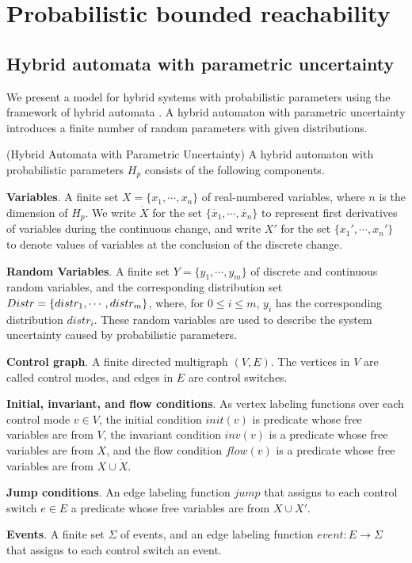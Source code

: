 \section{Probabilistic bounded reachability}

\subsection{Hybrid automata with parametric uncertainty}
We present a model for hybrid systems with probabilistic parameters using the framework of hybrid automata \cite{henzinger2000theory}. A hybrid automaton with parametric uncertainty introduces a finite number of random 
parameters with given distributions.
\begin{definition}
\label{def:ha}
{\rm(Hybrid Automata with Parametric Uncertainty)} A hybrid automaton with probabilistic parameters $H_p$ consists of the following components.

{\bf Variables}. A finite set $X = \{ x_1, \cdots, x_n \}$ of real-numbered variables, where $n$ is the dimension of $H_p$. We write $\dot{X}$ for the set $\{\dot{x_1}, \cdots, \dot{x_n}\}$ to represent first derivatives of variables during the continuous change, and write $X'$ for the set $\{x_1', \cdots, x_n'\}$ to denote values of variables at the conclusion of the discrete change.

{\bf Random Variables}. A finite set $Y = \{ y_1, \cdots, y_m \}$ of discrete and continuous random variables, and the corresponding distribution set $Distr=\{distr_1, \cdots,\\ distr_m\}$, where, for $0 \le i \le m$, $y_i$ has the corresponding distribution $distr_i$. These random variables are used to describe the system uncertainty caused by probabilistic parameters.

{\bf Control graph}. A finite directed multigraph $(V,E)$. The vertices in $V$ are called control modes, and edges in $E$ are control switches.

{\bf Initial, invariant, and flow conditions}. As vertex labeling functions over each control mode $v \in V$, the initial condition $init(v)$ is predicate whose free variables are from $V$, the invariant condition $inv(v)$ is a predicate whose free variables are from $X$, and the flow condition $flow(v)$ is a predicate whose free variables are from $X \cup \dot{X}$.

{\bf Jump conditions}. An edge labeling function $jump$ that assigns to each control switch $e \in E$ a predicate whose free variables are from $X \cup X'$.

{\bf Events}. A finite set $\Sigma$ of events, and an edge labeling function $event: E \to \Sigma$ that assigns to each control switch an event. 
 
\end{definition}

